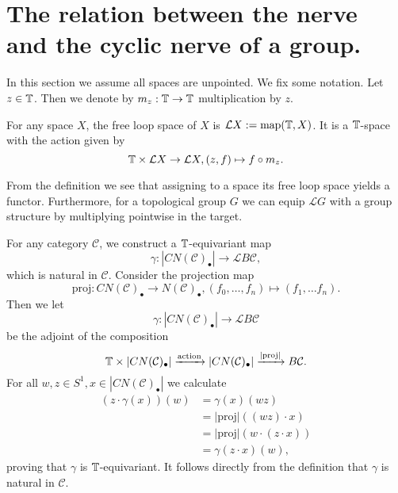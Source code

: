 \section{The relation between the nerve and the cyclic nerve of a group.}
In this section we assume all spaces
are unpointed. We fix some notation. Let $z\in \mathbb{T}$. Then we denote by $m_z:\mathbb{T}\to \mathbb{T}$
multiplication by $z$.
\begin{mydef}
For any space $X$, the free loop space of $X$ is $\mathcal{L}X:=\mathrm{map}(\mathbb{T}, X)$.
It is a $\mathbb{T}$-space with the action given by
$$\mathbb{T}\times \mathcal{L}X\to \mathcal{L}X, (z, f)\mapsto f\circ m_z.$$
\end{mydef}
From the  definition we see that assigning to a space its free loop space
yields a functor. Furthermore, 
for a topological group $G$ we can equip
$\mathcal{L}G$ with a group structure by multiplying pointwise in the target.

For any category $\mathcal{C}$, we construct a $\mathbb{T}$-equivariant map
\[
\gamma: \left| CN(\mathcal{C})_\bullet\right|\rightarrow \mathcal{L}B\mathcal{C},
\]
which is natural in $\mathcal{C}$.
Consider the projection map
\begin{equation}\label{eq:nerveprojection}
\mathrm{proj}: CN(\mathcal{C})_\bullet\rightarrow N(\mathcal{C})_\bullet, (f_0,\ldots ,f_n)
\mapsto (f_1,\ldots f_n).
\end{equation}
Then we let 
$$\gamma: \left| CN(\mathcal{C})_\bullet\right|\rightarrow \mathcal{L}B\mathcal{C}$$
be the adjoint of the composition
$$ \mathbb{T} \times \left| CN(\mathcal{C})_\bullet\right| 
\xrightarrow{\mathrm{action}}
\left| CN(\mathcal{C})_\bullet\right|\xrightarrow{|\mathrm{proj}|}
B\mathcal{C}.$$ 
For all $w,z\in S^1, x\in \left| CN(\mathcal{C})_\bullet\right|$ we calculate
\begin{align*}
(z\cdot\gamma(x))(w)&=\gamma(x)(wz)\\
&=|\mathrm{proj}|((wz)\cdot x)\\
&=|\mathrm{proj}|(w\cdot(z\cdot x))\\
&=\gamma(z\cdot x)(w),
\end{align*}
proving that $\gamma$ is $\mathbb{T}$-equivariant. It follows directly from the definition
that $\gamma$ is natural in $\mathcal{C}$.

